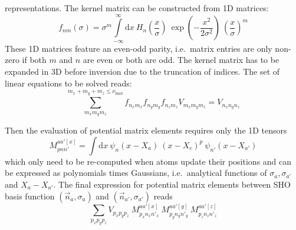 \documentclass[oribibl]{llncs}
\newcommand{\um}[1]{_{\mathrm{#1}}}
\newcommand{\numax}{\nu\um{max}}
\begin{document}
representations. The kernel matrix can be constructed from 1D matrices:
$$ f_{nm}(\sigma) = \sigma^m \int\limits_{-\infty}^{\infty} \mathrm dx \  H_{n}\left( \frac{x}{\sigma} \right) \  \exp\left( -\frac{x^2}{2\sigma^2} \right) \  \left(\frac{x}{\sigma}\right)^m $$
These 1D matrices feature an even-odd parity, 
i.e.~matrix entries are only non-zero if both $m$ and $n$ are even or both are odd.
The kernel matrix has to be expanded in 3D before inversion due to the truncation
of indices. The set of linear equations to be solved reads:
$$ \sum_{m_x m_y m_z}^{m_x + m_y + m_z \leq \numax} f_{n_x m_x} f_{n_y m_y} f_{n_z m_z} V_{m_x m_y m_z} = V_{n_x n_y n_z} $$

\noindent
Then the evaluation of potential matrix elements requires only the 1D tensors
\begin{equation}
	M_{pnn'}^{aa'[x]} = \int \mathrm d x  \  \psi_{n}(x - X_{a}) \  (x - X_{c})^{p} \  \psi_{n'}(x - X_{a'})
	\label{eq:local_moment_matrix_elements}
\end{equation}
which only need to be re-computed when atoms update their positions
and can be expressed as polynomials times Gaussians, i.e.~analytical functions of $\sigma_a, \sigma_{a'}$ and $X_a - X_{a'}$.
The final expression for potential matrix elements between \ac{SHO} basis function $(\vec n_a,\sigma_a)$ and $(\vec n_{a'},\sigma_{a'})$ reads
\begin{equation}
	\sum_{p_x p_y p_z} V_{p_x p_y p_z} \  M_{p_x n_x n'_x}^{aa'[x]} \  M_{p_y n_y n'_y}^{aa'[y]} \  M_{p_z n_z n'_z}^{aa'[z]}
	\label{eq:local_moment_matrix_elements_from_tensors}
\end{equation}
\end{document}
